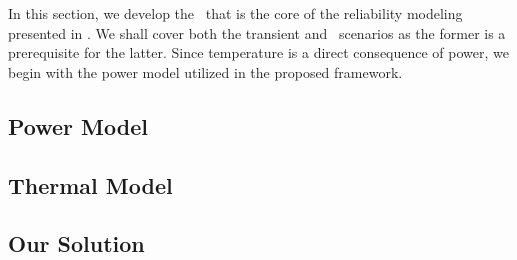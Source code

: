 In this section, we develop the \ta\ that is the core of the reliability modeling presented in .
We shall cover both the transient and \dss\ scenarios as the former is a prerequisite for the latter.
Since temperature is a direct consequence of power, we begin with the power model utilized in the proposed framework.

\subsection{Power Model} 


\subsection{Thermal Model} 


\subsection{Our Solution} 

